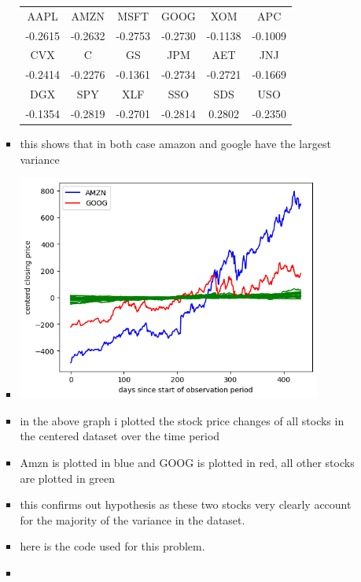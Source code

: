\documentclass[12pt,twoside]{article}
\begin{document}
\begin{enumerate}
\begin{enumerate}
\begin{itemize}
\begin{center}
    \begin{tabular}{c|c|c|c|c|c}
    AAPL & AMZN & MSFT & GOOG & XOM & APC\\
    -0.2615 & -0.2632 & -0.2753 & -0.2730 & -0.1138 & -0.1009\\
    \hline
    CVX & C & GS & JPM & AET & JNJ\\
    -0.2414 & -0.2276 & -0.1361 & -0.2734 & -0.2721 & -0.1669\\
    \hline
    DGX & SPY & XLF & SSO & SDS & USO\\
    -0.1354 & -0.2819 & -0.2701 & -0.2814 & 0.2802 & -0.2350\\
    \end{tabular}
    \end{center}
  \item this shows that in both case amazon and google have the largest variance
  \item \includegraphics[width=10cm]{homework/homework_8/images/h8_1.png}
    \item in the above graph i plotted the stock price changes of all stocks in the centered dataset over the time period
    \item Amzn is plotted in blue and GOOG is plotted in red, all other stocks are plotted in green 
    \item this confirms out hypothesis as these two stocks very clearly account for the majority of the variance in the dataset. 
    \item here is the code used for this problem.
    \item \inputminted[firstline=118, lastline=175, breaklines=True]{python}{hw8.py}
\end{itemize}
    

\end{enumerate}
\end{enumerate}
\end{document}
